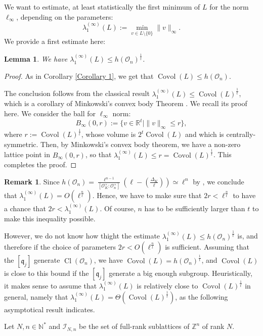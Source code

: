 \documentclass[a4paper,10pt]{report}
\theoremstyle{definition}
\theoremstyle{plain}
\newtheorem{Lemma}[Definition]{Lemma}
\theoremstyle{definition}
\newtheorem{Remark}[Definition]{Remark}
\newcommand{\N}{\mathbb{N}}
\newcommand{\Z}{\mathbb{Z}}
\newcommand{\R}{\mathbb{R}}
\newcommand{\m}[1]{\mathcal{#1}}
\newcommand{\mO}{\mathcal{O}}
\renewcommand{\(}{\left(}
\renewcommand{\)}{\right)}
\newcommand{\mf}[1]{\mathfrak{#1}}
\DeclareMathOperator{\Cl}{Cl}
\DeclareMathOperator{\Covol}{Covol}
\begin{document}
We want to estimate, at least statistically the first minimum of $L$ for the norm $\ell_\infty$, depending on the parameters:
\[\lambda_1^{(\infty)}(L):=\min_{v\in L\setminus\{0\}}\|v\|_\infty.\]
We provide a first estimate here:

\begin{Lemma}
We have $\lambda_1^{(\infty)}(L)\leq h(\mO_n)^{\frac{1}{t}}$.
\end{Lemma}

\begin{proof}
As in Corollary \ref{Corollary 1}, we get that $\Covol(L)\leq h(\mO_n)$.

The conclusion follows from the classical result $\lambda_1^{(\infty)}(L)\leq \Covol(L)^{\frac{1}{t}}$, which is a corollary of Minkowski's convex body Theorem \cite[Theorem V.3]{Lang_ANT}. We recall its proof here. We consider the ball for $\ell_\infty$ norm:
\[B_\infty(0,r):=\{v\in\R^t\mid \|v\|_\infty\leq r\},\]
where $r:=\Covol(L)^{\frac{1}{t}}$, whose volume is $2^t\Covol(L)$ and which is centrally-symmetric. Then, by Minkowski's convex body theorem, we have a non-zero lattice point in $B_\infty(0,r)$, so that $\lambda_1^{(\infty)}(L)\leq r=\Covol(L)^{\frac{1}{t}}$. This completes the proof.
\end{proof}

\begin{Remark}
Since $h(\mO_n)=\frac{\ell^{n-1}}{[\mO_K^\times:\mO_n^\times]}\(\ell-\(\frac{\Delta_K}{\ell}\)\)\simeq\ell^n$ by \cite[Theorem 7.24]{Cox}, we conclude that $\lambda_1^{(\infty)}(L)=O(\ell^{\frac{n}{t}})$. Hence, we have to make sure that $2r<\ell^{\frac{n}{t}}$ to have a chance that $2r<\lambda_1^{(\infty)}(L)$.  Of course, $n$ has to be sufficiently larger than $t$ to make this inequality possible.

However, we do not know how thight the estimate $\lambda_1^{(\infty)}(L)\leq h(\mO_n)^{\frac{1}{t}}$ is, and therefore if the choice of parameters $2r<O(\ell^{\frac{n}{t}})$ is sufficient. Assuming that the $[\mf{q}_j]$ generate $\Cl(\mO_n)$, we have $\Covol(L)=h(\mO_n)^{\frac{1}{t}}$, and $\Covol(L)$ is close to this bound if the $[\mf{q}_j]$ generate a big enough subgroup. Heuristically, it makes sense to assume that $\lambda_1^{(\infty)}(L)$ is relatively close to $\Covol(L)^{\frac{1}{t}}$ in general, namely that $\lambda_1^{(\infty)}(L)=\Theta(\Covol(L)^{\frac{1}{t}})$, as the following asymptotical result indicates. 
\end{Remark}

Let $N, n\in\N^*$ and $\m{I}_{N,n}$ be the set of full-rank sublattices of $\Z^n$ of rank $N$.
\end{document}
